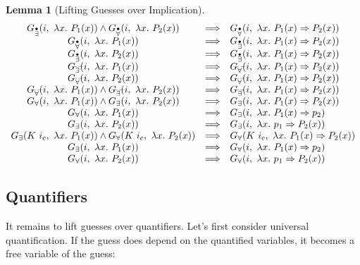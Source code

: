 \documentclass[a4paper,12pt,DIV=12,oneside]{scrbook}
\newtheorem{lemma}{Lemma}[section]
\theoremstyle{definition}
\theoremstyle{remark}
\newcommand{\GE}{\ensuremath{G_\exists}}
\newcommand{\GEP}{\ensuremath{G_{\accentset{\bullet}{\exists}}}}
\newcommand{\GEG}{\ensuremath{G_{\accentset{\_\,\_}{\exists}}}}
\newcommand{\GU}{\ensuremath{G_\forall}}
\newcommand{\GUP}{\ensuremath{G_{\accentset{\bullet}{\forall}}}}
\newcommand{\GUG}{\ensuremath{G_{\accentset{\_\,\_}{\forall}}}}
\begin{document}
\begin{lemma}[Lifting Guesses over Implication]\label{lemma_guesses_lift_imp}
\[
\begin{array}{c@{\quad}c@{\quad}l}
\GEP(i,\ \lambda x.\ P_1(x)) \wedge \GUP(i,\ \lambda x.\ P_2(x)) & \Longrightarrow & \GUP(i,\ \lambda x.\ P_1(x) \Rightarrow P_2(x)) \\
\GUP(i,\ \lambda x.\ P_1(x)) & \Longrightarrow & \GEP(i,\ \lambda x.\ P_1(x) \Rightarrow P_2(x)) \\
\GEP(i,\ \lambda x.\ P_2(x)) & \Longrightarrow & \GEP(i,\ \lambda x.\ P_1(x) \Rightarrow P_2(x)) \\

\GEG(i,\ \lambda x.\ P_1(x)) & \Longrightarrow & \GUG(i,\ \lambda x.\ P_1(x) \Rightarrow P_2(x)) \\
\GUG(i,\ \lambda x.\ P_2(x)) & \Longrightarrow & \GUG(i,\ \lambda x.\ P_1(x) \Rightarrow P_2(x)) \\
\GUG(i,\ \lambda x.\ P_1(x)) \wedge \GEG(i,\ \lambda x.\ P_2(x)) & \Longrightarrow & \GEG(i,\ \lambda x.\ P_1(x) \Rightarrow P_2(x)) \\

\GU(i,\ \lambda x.\ P_1(x)) \wedge \GE(i,\ \lambda x.\ P_2(x)) & \Longrightarrow & \GE(i,\ \lambda x.\ P_1(x) \Rightarrow P_2(x)) \\
\GU(i,\ \lambda x.\ P_1(x)) & \Longrightarrow & \GE(i,\ \lambda x.\ P_1(x) \Rightarrow p_2) \\
\GE(i,\ \lambda x.\ P_2(x)) & \Longrightarrow & \GE(i,\ \lambda x.\ p_1 \Rightarrow P_2(x)) \\

\GE(K\ i_c,\ \lambda x.\ P_1(x)) \wedge \GU(K\ i_c,\ \lambda x.\ P_2(x)) & \Longrightarrow & \GU(K\ i_c,\ \lambda x.\ P_1(x) \Rightarrow P_2(x)) \\
\GE(i,\ \lambda x.\ P_1(x)) & \Longrightarrow & \GU(i,\ \lambda x.\ P_1(x) \Rightarrow p_2) \\
\GU(i,\ \lambda x.\ P_2(x)) & \Longrightarrow & \GU(i,\ \lambda x.\ p_1 \Rightarrow P_2(x)) \\
\end{array}
\]
\end{lemma}


\subsection{Quantifiers}

It remains to lift guesses over quantifiers. Let's first consider universal quantification. 
If the guess does depend on the quantified variables, it becomes a free variable of the guess:
\end{document}
